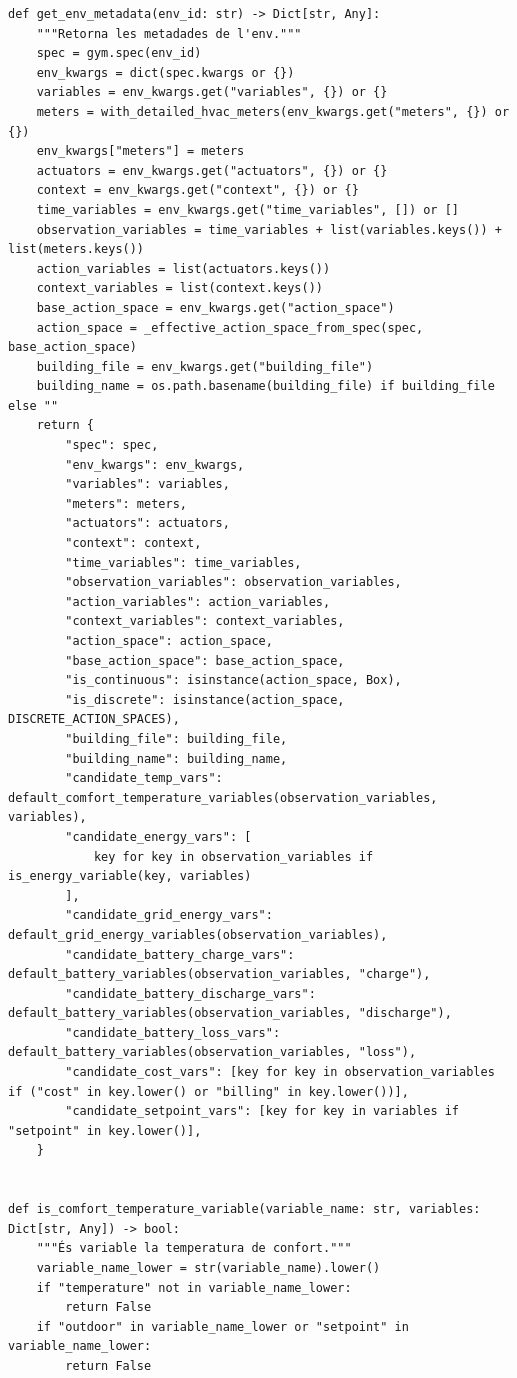 \documentclass[10pt,a4paper]{article}
\begin{document}
\begin{lstlisting}[style=studioPython,caption={backend/entrenar\_agent\_env.py},label={lst:backend-entrenar-agent-env-py}]
def get_env_metadata(env_id: str) -> Dict[str, Any]:
    """Retorna les metadades de l'env."""
    spec = gym.spec(env_id)
    env_kwargs = dict(spec.kwargs or {})
    variables = env_kwargs.get("variables", {}) or {}
    meters = with_detailed_hvac_meters(env_kwargs.get("meters", {}) or {})
    env_kwargs["meters"] = meters
    actuators = env_kwargs.get("actuators", {}) or {}
    context = env_kwargs.get("context", {}) or {}
    time_variables = env_kwargs.get("time_variables", []) or []
    observation_variables = time_variables + list(variables.keys()) + list(meters.keys())
    action_variables = list(actuators.keys())
    context_variables = list(context.keys())
    base_action_space = env_kwargs.get("action_space")
    action_space = _effective_action_space_from_spec(spec, base_action_space)
    building_file = env_kwargs.get("building_file")
    building_name = os.path.basename(building_file) if building_file else ""
    return {
        "spec": spec,
        "env_kwargs": env_kwargs,
        "variables": variables,
        "meters": meters,
        "actuators": actuators,
        "context": context,
        "time_variables": time_variables,
        "observation_variables": observation_variables,
        "action_variables": action_variables,
        "context_variables": context_variables,
        "action_space": action_space,
        "base_action_space": base_action_space,
        "is_continuous": isinstance(action_space, Box),
        "is_discrete": isinstance(action_space, DISCRETE_ACTION_SPACES),
        "building_file": building_file,
        "building_name": building_name,
        "candidate_temp_vars": default_comfort_temperature_variables(observation_variables, variables),
        "candidate_energy_vars": [
            key for key in observation_variables if is_energy_variable(key, variables)
        ],
        "candidate_grid_energy_vars": default_grid_energy_variables(observation_variables),
        "candidate_battery_charge_vars": default_battery_variables(observation_variables, "charge"),
        "candidate_battery_discharge_vars": default_battery_variables(observation_variables, "discharge"),
        "candidate_battery_loss_vars": default_battery_variables(observation_variables, "loss"),
        "candidate_cost_vars": [key for key in observation_variables if ("cost" in key.lower() or "billing" in key.lower())],
        "candidate_setpoint_vars": [key for key in variables if "setpoint" in key.lower()],
    }


def is_comfort_temperature_variable(variable_name: str, variables: Dict[str, Any]) -> bool:
    """És variable la temperatura de confort."""
    variable_name_lower = str(variable_name).lower()
    if "temperature" not in variable_name_lower:
        return False
    if "outdoor" in variable_name_lower or "setpoint" in variable_name_lower:
        return False


\end{lstlisting}
\end{document}
